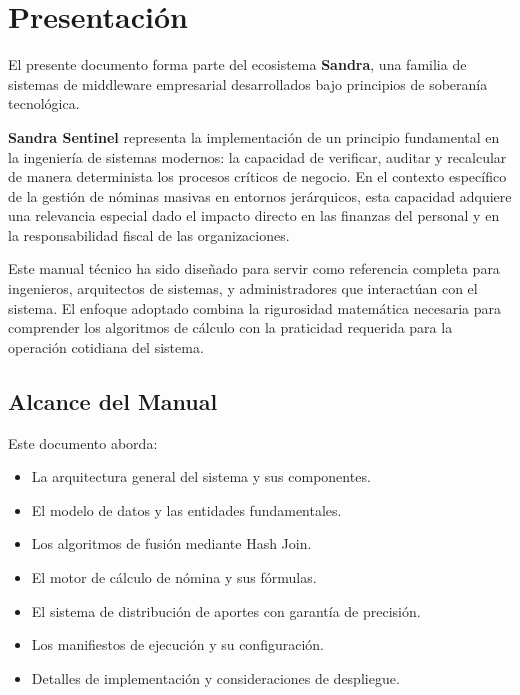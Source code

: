 \chapter*{Presentación}

\bigskip

\begin{cajaInfo}
El presente documento forma parte del ecosistema \textbf{Sandra}, una familia de sistemas de middleware empresarial desarrollados bajo principios de soberanía tecnológica.
\end{cajaInfo}

\bigskip

\textbf{Sandra Sentinel} representa la implementación de un principio fundamental en la ingeniería de sistemas modernos: la capacidad de verificar, auditar y recalcular de manera determinista los procesos críticos de negocio. En el contexto específico de la gestión de nóminas masivas en entornos jerárquicos, esta capacidad adquiere una relevancia especial dado el impacto directo en las finanzas del personal y en la responsabilidad fiscal de las organizaciones.

Este manual técnico ha sido diseñado para servir como referencia completa para ingenieros, arquitectos de sistemas, y administradores que interactúan con el sistema. El enfoque adoptado combina la rigurosidad matemática necesaria para comprender los algoritmos de cálculo con la praticidad requerida para la operación cotidiana del sistema.

\bigskip

\section*{Alcance del Manual}

Este documento aborda:

\begin{itemize}
    \item La arquitectura general del sistema y sus componentes.
    \item El modelo de datos y las entidades fundamentales.
    \item Los algoritmos de fusión mediante Hash Join.
    \item El motor de cálculo de nómina y sus fórmulas.
    \item El sistema de distribución de aportes con garantía de precisión.
    \item Los manifiestos de ejecución y su configuración.
    \item Detalles de implementación y consideraciones de despliegue.
\end{itemize}

